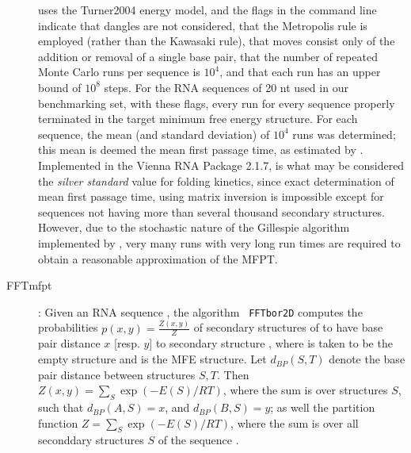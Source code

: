 \begin{description}
\begin{quote}
\end{quote}
 uses the Turner2004 energy model, and the flags in
the command line indicate that dangles are not considered, that the
Metropolis rule is employed (rather than the Kawasaki rule), that
moves consist only of the addition or removal of a single base pair,
that the number of repeated Monte Carlo runs per sequence is $10^4$,
and that each run has an upper bound of $10^8$ steps. For the RNA
sequences of 20 nt used in our benchmarking set, with these flags,
every run for every sequence properly terminated in the target minimum
free energy structure. For each sequence, the mean (and standard
deviation) of $10^4$ runs was determined; this mean is deemed the mean
first passage time, as estimated by \kinfold. Implemented in the
Vienna RNA Package 2.1.7, \kinfold is what may be considered the
{\em silver standard} value for folding kinetics, since exact
determination of mean first passage time, using matrix inversion is
impossible except for sequences not having more than several thousand
secondary structures. However, due to the stochastic nature of the
Gillespie algorithm implemented by \kinfold, very many runs with
very long run times are required to obtain a reasonable approximation
of the MFPT.

\item[FFTmfpt]: Given an RNA sequence \seq, the algorithm {\tt
FFTbor2D} \citep{Senter.jmb14} computes the probabilities $p(x,y) =
\frac{Z(x,y)}{Z}$ of secondary structures of \seq to have base pair
distance $x$ [resp. $y$] to secondary structure , where
\strA is taken to be the empty structure and \strB is the MFE structure.
Let $d_{BP}(S,T)$ denote the base pair distance between structures
$S,T$. Then $Z(x,y) = \sum_S \exp(-E(S)/RT)$, where the sum is over
structures $S$, such that $d_{BP}(A,S)=x$, and $d_{BP}(B,S)=y$; as
well the partition function $Z =\sum_S \exp(-E(S)/RT)$, where the sum
is over all seconddary structures $S$ of the sequence \seq.


\end{description}
